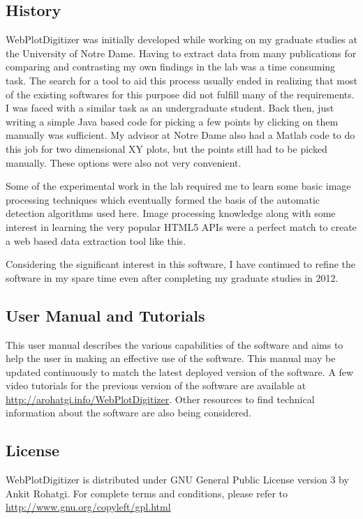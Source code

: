 \documentclass[letterpaper, 10pt]{article}
\begin{document}
\subsection{History}
WebPlotDigitizer was initially developed while working on my graduate studies at the University of Notre Dame. Having to extract data from many publications for comparing and contrasting my own findings in the lab was a time consuming task. The search for a tool to aid this process usually ended in realizing that most of the existing softwares for this purpose did not fulfill many of the requirements. I was faced with a similar task as an undergraduate student. Back then, just writing a simple Java based code for picking a few points by clicking on them manually was sufficient. My advisor at Notre Dame also had a Matlab code to do this job for two dimensional XY plots, but the points still had to be picked manually. These options were also not very convenient.

Some of the experimental work in the lab required me to learn some basic image processing techniques which eventually formed the basis of the automatic detection algorithms used here. Image processing knowledge along with some interest in learning the very popular HTML5 APIs were a perfect match to create a web based data extraction tool like this.

Considering the significant interest in this software, I have continued to refine the software in my spare time even after completing my graduate studies in 2012.

\subsection{User Manual and Tutorials}
This user manual describes the various capabilities of the software and aims to help the user in making an effective use of the software. This manual may be updated continuously to match the latest deployed version of the software. A few video tutorials for the previous version of the software are available at \url{http://arohatgi.info/WebPlotDigitizer}. Other resources to find technical information about the software are also being considered.

\subsection{License}
WebPlotDigitizer is distributed under GNU General Public License version 3 by Ankit Rohatgi. For complete terms and conditions, please refer to \url{http://www.gnu.org/copyleft/gpl.html}
\end{document}
